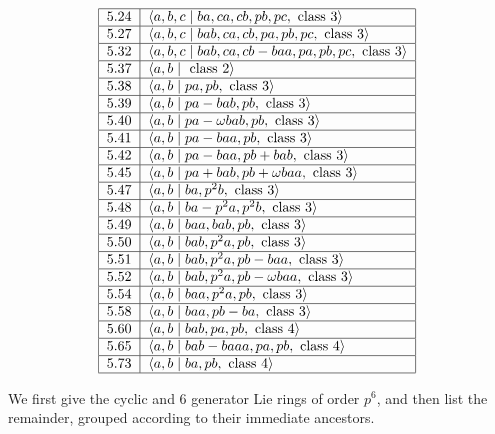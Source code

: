\documentclass[10pt]{article}
\begin{document}
{\[\begin{tabular}{|l|l|}
\hline
5.24 & $\langle a,b,c\;|\;ba,ca,cb,pb,pc,\text{ class }3\rangle $ \\ \hline
5.27 & $\langle a,b,c\;|\;bab,ca,cb,pa,pb,pc,\text{ class }3\rangle $ \\ 
\hline
5.32 & $\langle a,b,c\;|\;bab,ca,cb-baa,pa,pb,pc,\text{ class }3\rangle $ \\ 
\hline
5.37 & $\langle a,b\;|\;\text{ class }2\rangle $ \\ \hline
5.38 & $\langle a,b\;|\;pa,pb,\text{ class }3\rangle $ \\ \hline
5.39 & $\langle a,b\;|\;pa-bab,pb,\text{ class }3\rangle $ \\ \hline
5.40 & $\langle a,b\;|\;pa-\omega bab,pb,\text{ class }3\rangle $ \\ \hline
5.41 & $\langle a,b\;|\;pa-baa,pb,\text{ class }3\rangle $ \\ \hline
5.42 & $\langle a,b\;|\;pa-baa,pb+bab,\text{ class }3\rangle $ \\ \hline
5.45 & $\langle a,b\;|\;pa+bab,pb+\omega baa,\text{ class }3\rangle $ \\ 
\hline
5.47 & $\langle a,b\;|\;ba,p^{2}b,\text{ class }3\rangle $ \\ \hline
5.48 & $\langle a,b\;|\;ba-p^{2}a,p^{2}b,\text{ class }3\rangle $ \\ \hline
5.49 & $\langle a,b\;|\;baa,bab,pb,\text{ class }3\rangle $ \\ \hline
5.50 & $\langle a,b\;|\;bab,p^{2}a,pb,\text{ class }3\rangle $ \\ \hline
5.51 & $\langle a,b\;|\;bab,p^{2}a,pb-baa,\text{ class }3\rangle $ \\ \hline
5.52 & $\langle a,b\;|\;bab,p^{2}a,pb-\omega baa,\text{ class }3\rangle $ \\ 
\hline
5.54 & $\langle a,b\;|\;baa,p^{2}a,pb,\text{ class }3\rangle $ \\ \hline
5.58 & $\langle a,b\;|\;baa,pb-ba,\text{ class }3\rangle $ \\ \hline
5.60 & $\langle a,b\;|\;bab,pa,pb,\text{ class }4\rangle $ \\ \hline
5.65 & $\langle a,b\;|\;bab-baaa,pa,pb,\text{ class }4\rangle $ \\ \hline
5.73 & $\langle a,b\;|\;ba,pb,\text{ class }4\rangle $ \\ \hline
\end{tabular}%
\ 
\]%
}

We first give the cyclic and 6 generator Lie rings of order $p^{6}$, and
then list the remainder, grouped according to their immediate ancestors.
\end{document}

